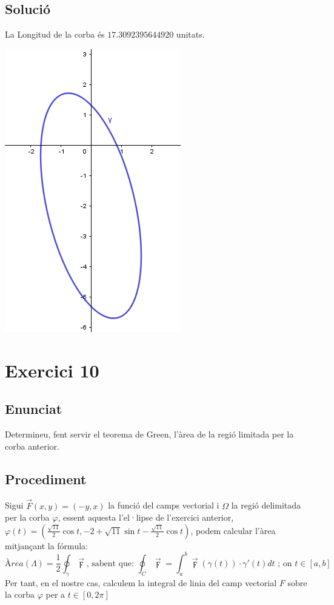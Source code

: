 \documentclass[12pt]{report}
\begin{document}
\section{Solució}
La Longitud de la corba  és $17.3092395644920$ unitats.
\begin{center}
    \includegraphics{elipse.PNG}
\end{center}


\chapter{Exercici 10}
\section{Enunciat}
Determineu, fent servir el teorema de Green, l'àrea de la regió limitada per la corba anterior.
\section{Procediment}
Sigui $\overrightarrow{F}(x,y)=(-y,x)$ la funció del camps vectorial i $\Omega$ la regió delimitada per la corba $\varphi$, essent aquesta l'el·lipse de l'exercici anterior, $\varphi(t)= \left(\frac{\sqrt{11}}{2}\cos{t},-2+\sqrt{11}\sin{t}-\frac{\sqrt{11}}{2}\cos{t}\right)$, podem calcular l'àrea mitjançant la fórmula:
$$Àrea(\Lambda)= \frac{1}{2} \oint_{\gamma} \overrightarrow{\digamma} \text{,     sabent que:     } \oint_C \overrightarrow{\digamma} = \int_{a}^{b} \overrightarrow{\digamma}(\gamma(t)) \cdot \gamma'(t)dt \text{ ; on } t \in [a,b]$$
Per tant, en el nostre cas, calculem la integral de linia del camp vectorial $F$ sobre la corba $\varphi$ per a $t \in [0,2\pi]$
\end{document}
